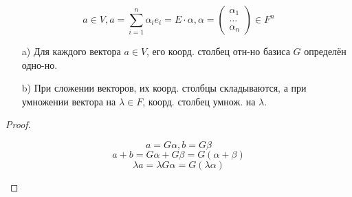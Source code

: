 \[
a \in V, a = \sum_{i = 1}^{n} \alpha_i e_i = E \cdot \alpha, \alpha = \begin{pmatrix}\alpha_1 \\ \ldots \\ \alpha_n \end{pmatrix} \in F^{n}
\]
\begin{statement}
\begin{itemize}
  \item [a) ] Для каждого вектора $a \in V$, его коорд. столбец отн-но базиса $G$ определён одно-но.
  \item [b) ] При сложении векторов, их коорд. столбцы складываются, а при умножении вектора на $\lambda \in F$, коорд. столбец умнож. на $\lambda$.
\end{itemize}
\end{statement}
\begin{proof}
\begin{itemize}
  \[
  a = G \alpha, b = G \beta
  \]
  \[
  a + b = G\alpha + G\beta = G(\alpha + \beta)
  \]
  \[
  \lambda a = \lambda G \alpha = G (\lambda\alpha)
  \]
\end{itemize}
\end{proof}
